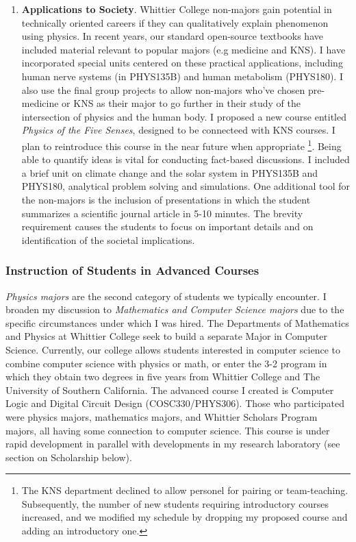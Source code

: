 \documentclass[../../main.tex]{subfiles}
\begin{document}
\begin{enumerate}
\item \textbf{Applications to Society}. Whittier College non-majors gain potential in technically oriented careers if they can qualitatively explain phenomenon using physics.  In recent years, our standard open-source textbooks have included material relevant to popular majors (e.g medicine and KNS). I have incorporated special units centered on these practical applications, including human nerve systems (in PHYS135B) and human metabolism (PHYS180).  I also use the final group projects to allow non-majors who've chosen pre-medicine or KNS as their major to go further in their study of the intersection of physics and the human body.  I proposed a new course entitled \textit{Physics of the Five Senses}, designed to be connecteed with KNS courses.  I plan to reintroduce this course in the near future when appropriate \footnote{The KNS department declined to allow personel for pairing or team-teaching.  Subsequently, the number of new students requiring introductory courses increased, and we modified my schedule by dropping my proposed course and adding an introductory one.}. Being able to quantify ideas is vital for conducting fact-based discussions.  I included a brief unit on climate change and the solar system in PHYS135B and PHYS180, analytical problem solving and simulations.  One additional tool for the non-majors is the inclusion of presentations in which the student summarizes a scientific journal article in 5-10 minutes.  The brevity requirement causes the students to focus on important details and on identification of the societal implications.
\end{enumerate}

\subsubsection{Instruction of Students in Advanced Courses}

\label{sec:teaching_phil2}

\textit{Physics majors} are the second category of students we typically encounter.  I broaden my discussion to \textit{Mathematics and Computer Science majors} due to the specific circumstances under which I was hired.  The Departments of Mathematics and Physics at Whittier College seek to build a separate Major in Computer Science.  Currently, our college allows students interested in computer science to combine computer science with physics or math, or enter the 3-2 program in which they obtain two degrees in five years from Whittier College and The University of Southern California.  The advanced course I created is Computer Logic and Digital Circuit Design (COSC330/PHYS306).  Those who participated were physics majors, mathematics majors, and Whittier Scholars Program majors, all having some connection to computer science.  This course is under rapid development in parallel with developments in my research laboratory (see section on Scholarship below). \\ \hspace{0.1cm}
\end{document}
